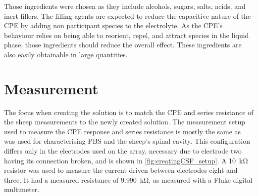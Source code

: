   Those ingredients were chosen as they include alcohols, sugars, salts, acids, and inert fillers.
  The filling agents are expected to reduce the capacitive nature of the CPE by adding non participant species to the electrolyte.
  As the CPE's behaviour relies on being able to reorient, repel, and attract species in the liquid phase, those ingredients should reduce the overall effect.
  These ingredients are also easily obtainable in large quantities.


\section{Measurement}

  The focus when creating the solution is to match the CPE and series resistance of the sheep measurements to the newly created solution.
  The measurement setup used to measure the CPE response and series resistance is mostly the same as was used for characterising PBS and the sheep's spinal cavity.
  This configuration differs only in the electrodes used on the array, necessary due to electrode two having its connection broken, and is shown in \cref{fig:creatingCSF_setup}.
  A \SI{10}{\kilo\ohm} resistor was used to measure the current driven between electrodes eight and three.
  It had a measured resistance of \SI{9.990}{\kilo\ohm}, as measured with a Fluke digital multimeter.

